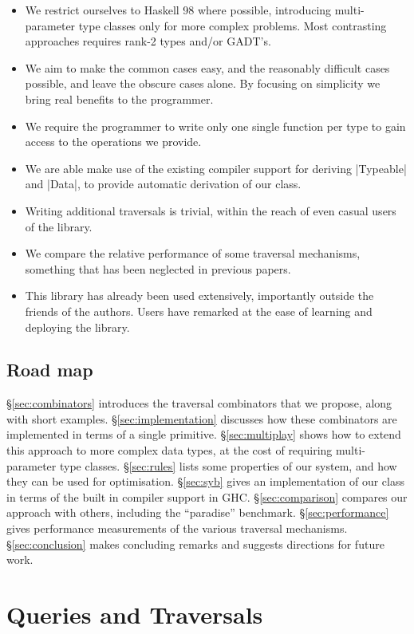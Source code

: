 \documentclass[preprint]{sigplanconf}
\begin{document}
\begin{itemize}
\item We restrict ourselves to Haskell 98 where possible, introducing multi-parameter type classes only for more complex problems. Most contrasting approaches requires rank-2 types and/or GADT's.
\item We aim to make the common cases easy, and the reasonably difficult cases possible, and leave the obscure cases alone. By focusing on simplicity we bring real benefits to the programmer.
\item We require the programmer to write only one single function per type to gain access to the operations we provide.
\item We are able make use of the existing compiler support for deriving |Typeable| and |Data|, to provide automatic derivation of our class.
\item Writing additional traversals is trivial, within the reach of even casual users of the library.
\item We compare the relative performance of some traversal mechanisms, something that has been neglected in previous papers.
\item This library has already been used extensively, importantly outside the friends of the authors. Users have remarked at the ease of learning and deploying the library.
\end{itemize}

\subsection{Road map}

\S\ref{sec:combinators} introduces the traversal combinators that we propose, along with short examples. \S\ref{sec:implementation} discusses how these combinators are implemented in terms of a single primitive. \S\ref{sec:multiplay} shows how to extend this approach to more complex data types, at the cost of requiring multi-parameter type classes. \S\ref{sec:rules} lists some properties of our system, and how they can be used for optimisation. \S\ref{sec:syb} gives an implementation of our class in terms of the built in compiler support in GHC. \S\ref{sec:comparison} compares our approach with others, including the ``paradise'' benchmark. \S\ref{sec:performance} gives performance measurements of the various traversal mechanisms. \S\ref{sec:conclusion} makes concluding remarks and suggests directions for future work.


\section{Queries and Traversals}
\end{document}
